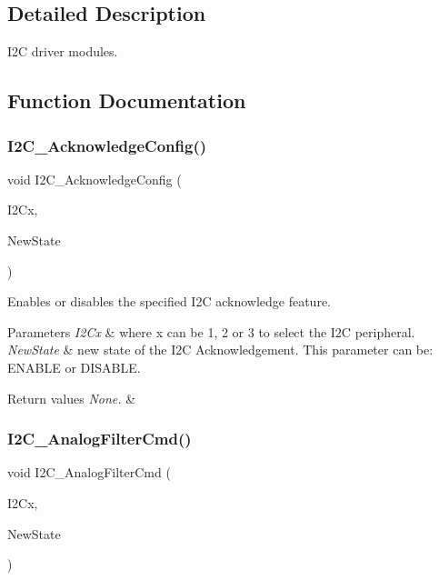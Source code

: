 \subsection{Detailed Description}
I2C driver modules. 



\subsection{Function Documentation}
\mbox{\label{group___i2_c_ga7bb44e894d68a7991f564c43fb187486}} 
\subsubsection{\texorpdfstring{I2\+C\+\_\+\+Acknowledge\+Config()}{I2C\_AcknowledgeConfig()}}
{\footnotesize\ttfamily void I2\+C\+\_\+\+Acknowledge\+Config (\begin{DoxyParamCaption}\item[{I2\+C\+\_\+\+Type\+Def $\ast$}]{I2\+Cx,  }\item[{Functional\+State}]{New\+State }\end{DoxyParamCaption})}



Enables or disables the specified I2C acknowledge feature. 


\begin{DoxyParams}{Parameters}
{\em I2\+Cx} & where x can be 1, 2 or 3 to select the I2C peripheral. \\
\hline
{\em New\+State} & new state of the I2C Acknowledgement. This parameter can be\+: E\+N\+A\+B\+LE or D\+I\+S\+A\+B\+LE. \\
\hline
\end{DoxyParams}

\begin{DoxyRetVals}{Return values}
{\em None.} & \\
\hline
\end{DoxyRetVals}
\mbox{\label{group___i2_c_ga7f92bbdb33774b819232d039c73bf1c2}} 
\subsubsection{\texorpdfstring{I2\+C\+\_\+\+Analog\+Filter\+Cmd()}{I2C\_AnalogFilterCmd()}}
{\footnotesize\ttfamily void I2\+C\+\_\+\+Analog\+Filter\+Cmd (\begin{DoxyParamCaption}\item[{I2\+C\+\_\+\+Type\+Def $\ast$}]{I2\+Cx,  }\item[{Functional\+State}]{New\+State }\end{DoxyParamCaption})}



